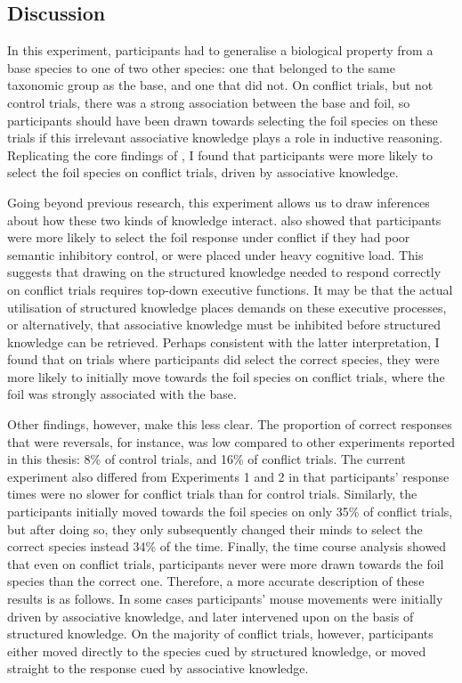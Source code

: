 
\subsection{Discussion}


 
In this experiment, participants had to generalise a biological property
from a base species to one of two other species:
one that belonged to the same taxonomic group as the base,
and one that did not.
On conflict trials, but not control trials,
there was a strong association between the base and foil,
so participants should have been drawn towards
selecting the foil species on these trials
if this irrelevant associative knowledge plays a role in inductive reasoning.
Replicating the core findings of \citet{Bright},
I found that participants were more likely to select the foil species
on conflict trials,
driven by associative knowledge.

Going beyond previous research, this experiment
allows us to draw inferences about how
these two kinds of knowledge interact.
\citet{Bright} also showed that
participants were more likely to select the foil response under conflict
if they had poor semantic inhibitory control,
or were placed under heavy cognitive load.
This suggests that drawing on the structured knowledge
needed to respond correctly on conflict trials
requires top-down executive functions.
It may be that the actual utilisation of structured knowledge
places demands on these executive processes, or alternatively,
that associative knowledge must be inhibited
before structured knowledge can be retrieved.
Perhaps consistent with the latter interpretation,
I found that on trials where participants did select the correct species,
they were more likely to initially move towards the foil species
on conflict trials, where the foil was strongly associated with the base.

Other findings, however, make this less clear.
The proportion of correct responses that were reversals, for instance,
was low compared to other experiments reported in this thesis:
8\% of control trials, and 16\% of conflict trials.
The current experiment also differed from Experiments 1 and 2
in that participants' response times were no slower
for conflict trials than for control trials.
Similarly, the participants initially moved towards
the foil species on only 35\% of conflict trials,
but after doing so, they only subsequently changed their minds
to select the correct species instead 34\% of the time.
Finally, the time course analysis showed that
even on conflict trials, participants never were more drawn
towards the foil species than the correct one.
Therefore, a more accurate description of these results is as follows.
In some cases participants' mouse movements
were initially driven by associative knowledge,
and later intervened upon on the basis of structured knowledge.
On the majority of conflict trials, however, participants either
moved directly to the species cued by structured knowledge,
or moved straight to the response cued by associative knowledge.

